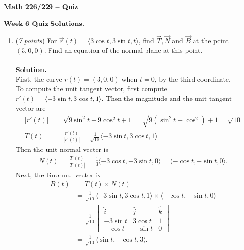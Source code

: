\documentclass[12 pt]{article}
\begin{document}
	\begin{center}
		\textbf{\hfill Math 226/229 -- Quiz} \\
	\end{center}
	\medskip

	\noindent
	\textbf{Week 6 Quiz Solutions.} \hfill
	\vspace{.1in}
	\hspace*{0.2in}
	\medskip
	\noindent
  \begin{enumerate}
		\item (\textit{7 points})
    For $\vec r(t) = \langle 3\cos t, 3\sin t, t \rangle$, find
    $\overrightarrow T, \overrightarrow N$ and $\overrightarrow B$ at the point
    $(3,0,0)$. Find an equation of the normal plane at this point.
    \\~\\
    \textbf{Solution.}
    \\
		First, the curve $r(t) = (3, 0, 0)$ when $t = 0$, by the third coordinate.\\
		To compute the unit tangent vector, first compute
		$r'(t) = \langle -3 \sin t, 3\cos t, 1 \rangle$. Then the magnitude
		and the unit tangent vector are
		\begin{align*}
			|r'(t)|
			&= \sqrt{9 \sin^2 t + 9 \cos^2 t + 1}
			= \sqrt{9(\sin^2 t + \cos^2) + 1}
			= \sqrt{10} \\
			T(t)
			&= \frac{r'(t)}{|r'(t)|}
			= \frac{1}{\sqrt{10}}\langle -3 \sin t, 3\cos t, 1 \rangle
		\end{align*}
		Then the unit normal vector is \begin{align*}
			N(t)
			= \frac{T'(t)}{|T'(t)|}
			= \frac13 \langle -3\cos t, -3\sin t, 0\rangle
			= \langle -\cos t, -\sin t, 0\rangle.
		\end{align*}
		Next, the binormal vector is \begin{align*}
			B(t)
			&= T(t) \times N(t) \\
			&= \frac{1}{\sqrt{10}}\langle -3 \sin t, 3\cos t, 1 \rangle \times \langle -\cos t, -\sin t, 0\rangle\\
			&= \frac{1}{\sqrt{10}}\begin{vmatrix}
				\hat i & \hat j & \hat k \\
				-3 \sin t & 3 \cos t & 1 \\
				-\cos t & -\sin t & 0
			\end{vmatrix} \\
			&= \frac{1}{\sqrt{10}} \langle \sin t, -\cos t, 3 \rangle.
		\end{align*}

\end{enumerate}
\end{document}
